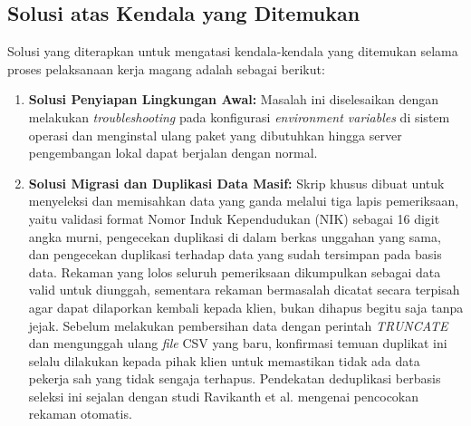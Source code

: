 \subsection{Solusi atas Kendala yang Ditemukan}
Solusi yang diterapkan untuk mengatasi kendala-kendala yang ditemukan selama proses pelaksanaan kerja magang adalah sebagai berikut:

\begin{enumerate}
    \item \textbf{Solusi Penyiapan Lingkungan Awal:} Masalah ini diselesaikan dengan melakukan \textit{troubleshooting} pada konfigurasi \textit{environment variables} di sistem operasi dan menginstal ulang paket yang dibutuhkan hingga server pengembangan lokal dapat berjalan dengan normal.
    \item \textbf{Solusi Migrasi dan Duplikasi Data Masif:} Skrip khusus dibuat untuk menyeleksi dan memisahkan data yang ganda melalui tiga lapis pemeriksaan, yaitu validasi format Nomor Induk Kependudukan (NIK) sebagai 16 digit angka murni, pengecekan duplikasi di dalam berkas unggahan yang sama, dan pengecekan duplikasi terhadap data yang sudah tersimpan pada basis data. Rekaman yang lolos seluruh pemeriksaan dikumpulkan sebagai data valid untuk diunggah, sementara rekaman bermasalah dicatat secara terpisah agar dapat dilaporkan kembali kepada klien, bukan dihapus begitu saja tanpa jejak. Sebelum melakukan pembersihan data dengan perintah \textit{TRUNCATE} dan mengunggah ulang \textit{file} CSV yang baru, konfirmasi temuan duplikat ini selalu dilakukan kepada pihak klien untuk memastikan tidak ada data pekerja sah yang tidak sengaja terhapus. Pendekatan deduplikasi berbasis seleksi ini sejalan dengan studi Ravikanth et al. \cite{ravikanth2024deduplication} mengenai pencocokan rekaman otomatis.
\end{enumerate}